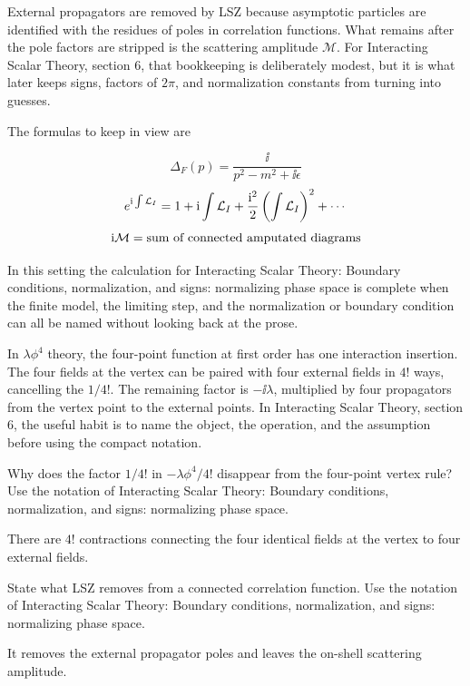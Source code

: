 External propagators are removed by LSZ because asymptotic particles are identified with the residues of poles in correlation functions.  What remains after the pole factors are stripped is the scattering amplitude \(\mathcal M\).  For Interacting Scalar Theory, section 6, that bookkeeping is deliberately modest, but it is what later keeps signs, factors of \(2\pi\), and normalization constants from turning into guesses.

The formulas to keep in view are

\[
  \Delta_F(p)=\frac{\ii}{p^2-m^2+\ii\epsilon}
\]
\[
  e^{\mathrm i\int\mathcal L_I}=1+\mathrm i\int\mathcal L_I+\frac{\mathrm i^2}{2}\left(\int\mathcal L_I\right)^2+\cdots
\]
\[
  \mathrm i\mathcal M=\hbox{sum of connected amputated diagrams}
\]

In this setting the calculation for Interacting Scalar Theory: Boundary conditions, normalization, and signs: normalizing phase space is complete when the finite model, the limiting step, and the normalization or boundary condition can all be named without looking back at the prose.




\begin{example}
In \(\lambda\phi^4\) theory, the four-point function at first order has one interaction insertion.  The four fields at the vertex can be paired with four external fields in \(4!\) ways, cancelling the \(1/4!\).  The remaining factor is \(-\ii\lambda\), multiplied by four propagators from the vertex point to the external points.  In Interacting Scalar Theory, section 6, the useful habit is to name the object, the operation, and the assumption before using the compact notation.
\end{example}



\begin{exercise}
Why does the factor \(1/4!\) in \(-\lambda\phi^4/4!\) disappear from the four-point vertex rule?  Use the notation of Interacting Scalar Theory: Boundary conditions, normalization, and signs: normalizing phase space.
\begin{answer}
There are \(4!\) contractions connecting the four identical fields at the vertex to four external fields.
\end{answer}
\end{exercise}

\begin{exercise}
State what LSZ removes from a connected correlation function.  Use the notation of Interacting Scalar Theory: Boundary conditions, normalization, and signs: normalizing phase space.
\begin{answer}
It removes the external propagator poles and leaves the on-shell scattering amplitude.
\end{answer}
\end{exercise}



